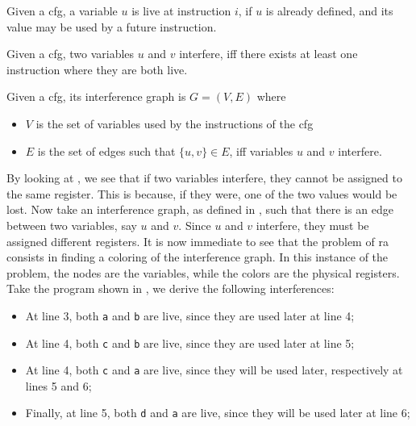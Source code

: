 \begin{definition}[Liveness]\label{def:liveness}
  Given a \gls{cfg}, a variable $u$ is live at instruction $i$, if $u$ is already defined, and its value may be used by a future instruction.
\end{definition}

\begin{definition}[Interference]
  Given a \gls{cfg}, two variables $u$ and $v$ interfere, iff there exists at least one instruction where they are both live.
\end{definition}

\begin{definition}\label{def:ig}
  Given a \gls{cfg}, its interference graph is $G = (V, E)$ where
  \begin{itemize}
  \item $V$ is the set of variables used by the instructions of the \gls{cfg}
  \item $E$ is the set of edges such that $\{ u, v \} \in E$, iff variables $u$ and $v$ interfere.
  \end{itemize}
\end{definition}

By looking at , we see that if two variables interfere, they cannot be assigned to the same register. This is because, if they were, one of the two values would be lost.
Now take an interference graph, as defined in , such that there is an edge between two variables, say $u$ and $v$. Since $u$ and $v$ interfere, they must be assigned different registers.
It is now immediate to see that the problem of \gls{ra} consists in finding a coloring of the interference graph. In this instance of the problem, the nodes are the variables, while the colors are the physical registers.
Take the program shown in , we derive the following interferences:
\begin{itemize}
  \item At line 3, both \texttt a and \texttt b are live, since they are used later at line 4;
  \item At line 4, both \texttt c and \texttt b are live, since they are used later at line 5;
  \item At line 4, both \texttt c and \texttt a are live, since they will be used later, respectively at lines 5 and 6;
  \item Finally, at line 5, both \texttt d and \texttt a are live, since they will be used later at line 6;
\end{itemize}

